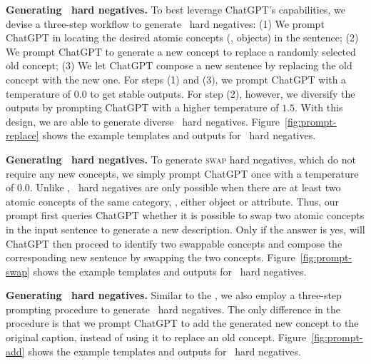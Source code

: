 \textbf{Generating \replace\ hard negatives.} 
To best leverage ChatGPT's capabilities, we devise a three-step workflow to generate \replace\ hard negatives: (1) We prompt ChatGPT in locating the desired atomic concepts (\eg, objects) in the sentence; (2) We prompt ChatGPT to generate a new concept to replace a randomly selected old concept; (3) We let ChatGPT compose a new sentence by replacing the old concept with the new one.
For steps (1) and (3), we prompt ChatGPT with a temperature of $0.0$ to get stable outputs. For step (2), however, we diversify the outputs by prompting ChatGPT with a higher temperature of $1.5$.
With this design, we are able to generate diverse \replace\ hard negatives.
Figure~\ref{fig:prompt-replace} shows the example templates and outputs for \replace\ hard negatives.

\textbf{Generating \swap\ hard negatives.} To generate \textsc{swap} hard negatives, which do not require any new concepts, we simply prompt ChatGPT once with a temperature of 0.0. Unlike \replace, \swap\ hard negatives are only possible when there are at least two atomic concepts of the same category, \ie, either object or attribute. Thus, our prompt first queries ChatGPT whether it is possible to swap two atomic concepts in the input sentence to generate a new description. Only if the answer is yes, will ChatGPT then proceed to identify two swappable concepts and compose the corresponding new sentence by swapping the two concepts.
Figure~\ref{fig:prompt-swap} shows the example templates and outputs for \swap\ hard negatives.

\textbf{Generating \add\ hard negatives.} Similar to the \replace, we also employ a three-step prompting procedure to generate \add\ hard negatives. The only difference in the procedure is that we prompt ChatGPT to add the generated new concept to the original caption, instead of using it to replace an old concept.
Figure~\ref{fig:prompt-add} shows the example templates and outputs for \add\ hard negatives.





